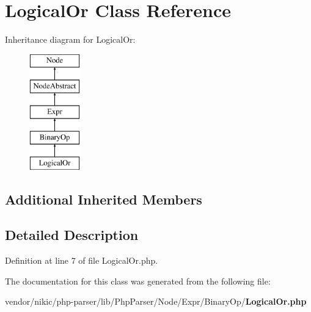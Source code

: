 \section{Logical\+Or Class Reference}
\label{class_php_parser_1_1_node_1_1_expr_1_1_binary_op_1_1_logical_or}
Inheritance diagram for Logical\+Or\+:\begin{figure}[H]
\begin{center}
\leavevmode
\includegraphics[height=5.000000cm]{class_php_parser_1_1_node_1_1_expr_1_1_binary_op_1_1_logical_or}
\end{center}
\end{figure}
\subsection*{Additional Inherited Members}


\subsection{Detailed Description}


Definition at line 7 of file Logical\+Or.\+php.



The documentation for this class was generated from the following file\+:\begin{DoxyCompactItemize}
\item 
vendor/nikic/php-\/parser/lib/\+Php\+Parser/\+Node/\+Expr/\+Binary\+Op/{\bf Logical\+Or.\+php}\end{DoxyCompactItemize}

